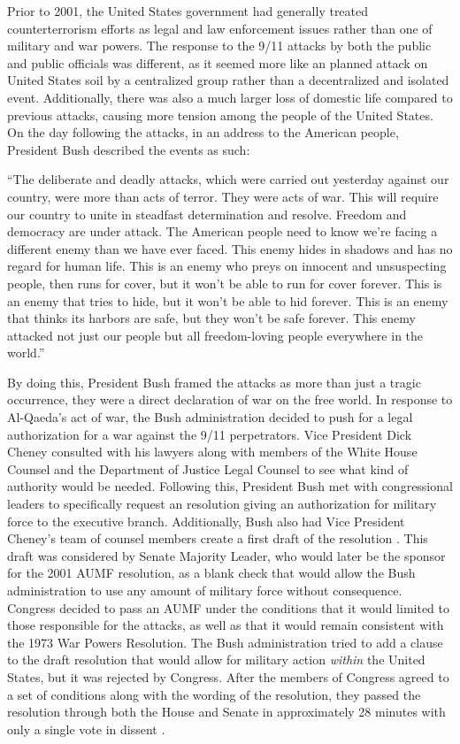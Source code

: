\documentclass[12pt]{article}
\begin{document}
Prior to 2001, the United States government had generally treated counterterrorism efforts as legal and law enforcement issues rather than one of military and war powers.
The response to the 9/11 attacks by both the public and public officials was different, as it seemed more like an planned attack on United States soil by a centralized group rather than a decentralized and isolated event.
Additionally, there was also a much larger loss of domestic life compared to previous attacks, causing more tension among the people of the United States.
On the day following the attacks, in an address to the American people, President Bush described the events as such:

\begin{displayquote}
``The deliberate and deadly attacks, which were carried out yesterday against our country, were more than acts of terror. They were acts of war. This will require our country to unite in steadfast determination and resolve. Freedom and democracy are under attack. The American people need to know we're facing a different enemy than we have ever faced. This enemy hides in shadows and has no regard for human life. This is an enemy who preys on innocent and unsuspecting people, then runs for cover, but it won't be able to run for cover forever. This is an enemy that tries to hide, but it won't be able to hid forever. This is an enemy that thinks its harbors are safe, but they won't be safe forever. This enemy attacked not just our people but all freedom-loving people everywhere in the world.'' \autocite{bush2001}
\end{displayquote}

\noindent
By doing this, President Bush framed the attacks as more than just a tragic occurrence, they were a direct declaration of war on the free world.
In response to Al-Qaeda's act of war, the Bush administration decided to push for a legal authorization for a war against the 9/11 perpetrators.
Vice President Dick Cheney consulted with his lawyers along with members of the White House Counsel and the Department of Justice Legal Counsel to see what kind of authority would be needed.
Following this, President Bush met with congressional leaders to specifically request an resolution giving an authorization for military force to the executive branch.
Additionally, Bush also had Vice President Cheney's team of counsel members create a first draft of the resolution \autocite[176]{murray2015}.
This draft was considered by Senate Majority Leader, who would later be the sponsor for the 2001 AUMF resolution, as a blank check that would allow the Bush administration to use any amount of military force without consequence.
Congress decided to pass an AUMF under the conditions that it would limited to those responsible for the attacks, as well as that it would remain consistent with the 1973 War Powers Resolution.
The Bush administration tried to add a clause to the draft resolution that would allow for military action \emph{within} the United States, but it was rejected by Congress.
After the members of Congress agreed to a set of conditions along with the wording of the resolution, they passed the resolution through both the House and Senate in approximately 28 minutes with only a single vote in dissent \autocite[177]{murray2015}.
\end{document}
